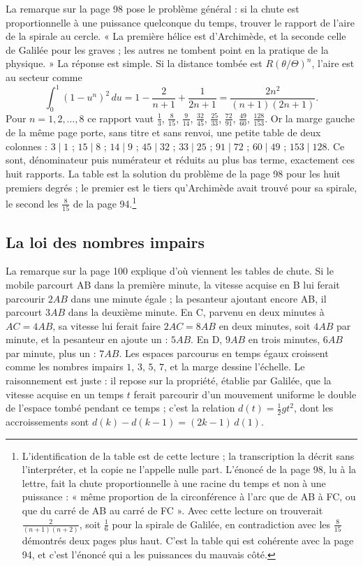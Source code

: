 \documentclass[11pt,a4paper]{article}
\begin{document}
La remarque sur la page 98 pose le problème général : si la chute est
proportionnelle à une puissance quelconque du temps, trouver le rapport de
l'aire de la spirale au cercle. « La première hélice est d'Archimède, et la
seconde celle de Galilée pour les graves ; les autres ne tombent point en la
pratique de la physique. » La réponse est simple. Si la distance tombée est
$R(\theta/\Theta)^n$, l'aire est au secteur comme
\[
\int_0^1 (1-u^n)^2\,du = 1 - \frac{2}{n+1} + \frac{1}{2n+1}
 = \frac{2n^2}{(n+1)(2n+1)} .
\]
Pour $n = 1, 2, \dots, 8$ ce rapport vaut $\frac13$, $\frac{8}{15}$,
$\frac{9}{14}$, $\frac{32}{45}$, $\frac{25}{33}$, $\frac{72}{91}$,
$\frac{49}{60}$, $\frac{128}{153}$. Or la marge gauche de la même page porte, sans
titre et sans renvoi, une petite table de deux colonnes : $3 \mid 1$ ;
$15 \mid 8$ ; $14 \mid 9$ ; $45 \mid 32$ ; $33 \mid 25$ ; $91 \mid 72$ ;
$60 \mid 49$ ; $153 \mid 128$. Ce sont, dénominateur puis numérateur et réduits
au plus bas terme, exactement ces huit rapports. La table est la solution du
problème de la page 98 pour les huit premiers degrés ; le premier est le
tiers qu'Archimède avait trouvé pour sa spirale, le second les $\frac{8}{15}$
de la page 94.\footnote{L'identification de la table est de cette lecture ;
la transcription la décrit sans l'interpréter, et la copie ne l'appelle
nulle part. L'énoncé de la page 98, lu à la lettre, fait la chute
proportionnelle à une racine du temps et non à une puissance : « même
proportion de la circonférence à l'arc que de AB à FC, ou que du carré de AB au
carré de FC ». Avec cette lecture on trouverait $\frac{2}{(n+1)(n+2)}$, soit
$\frac16$ pour la spirale de Galilée, en contradiction avec les $\frac{8}{15}$
démontrés deux pages plus haut. C'est la table qui est cohérente avec la page 94,
et c'est l'énoncé qui a les puissances du mauvais côté.}

\subsection*{La loi des nombres impairs}

La remarque sur la page 100 explique d'où viennent les tables de chute. Si le
mobile parcourt AB dans la première minute, la vitesse acquise en B lui ferait
parcourir $2AB$ dans une minute égale ; la pesanteur ajoutant encore AB, il
parcourt $3AB$ dans la deuxième minute. En C, parvenu en deux minutes à
$AC = 4AB$, sa vitesse lui ferait faire $2AC = 8AB$ en deux minutes, soit $4AB$
par minute, et la pesanteur en ajoute un : $5AB$. En D, $9AB$ en trois minutes,
$6AB$ par minute, plus un : $7AB$. Les espaces parcourus en temps égaux croissent
comme les nombres impairs $1$, $3$, $5$, $7$, et la marge dessine l'échelle. Le
raisonnement est juste : il repose sur la propriété, établie par Galilée, que
la vitesse acquise en un temps $t$ ferait parcourir d'un mouvement uniforme le
double de l'espace tombé pendant ce temps ; c'est la relation
$d(t) = \frac12 g t^2$, dont les accroissements sont
$d(k) - d(k-1) = (2k-1)\,d(1)$.
\end{document}
